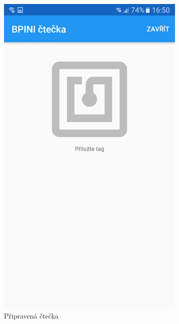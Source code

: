 \documentclass[czech,BP]{thesiskiv}
\begin{document}
\begin{figure}
	\centering
  \begin{subfigure}[b]{0.3\textwidth}
    \centering
	\includegraphics[width=\textwidth]{../images/client_android/Screenshot_20170607-165058.png}	
	\caption{Připravená čtečka}
	\label{fig:Screenshot_20170607-165058}
  \end{subfigure}
  \begin{subfigure}[b]{0.3\textwidth}
    \centering

\end{subfigure}
\end{figure}
\end{document}
